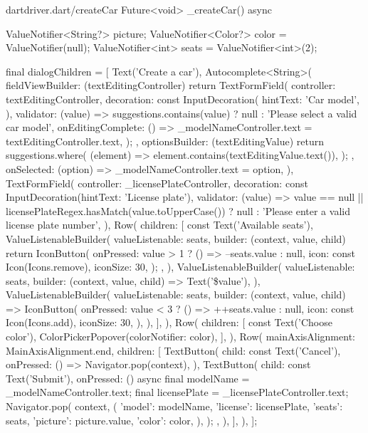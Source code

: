 \documentclass[../thesis.tex]{subfiles}
\begin{document}
\begin{codeblock}{dart}{driver.dart/createCar}
  Future<void> _createCar() async {
    ValueNotifier<String?> picture;
    ValueNotifier<Color?> color = ValueNotifier(null);
    ValueNotifier<int> seats = ValueNotifier<int>(2);

    final dialogChildren = [
      Text('Create a car'),
      Autocomplete<String>(
        fieldViewBuilder: (textEditingController) {
          return TextFormField(
            controller: textEditingController,
            decoration: const InputDecoration(
              hintText: 'Car model',
            ),
            validator: (value) => suggestions.contains(value)
                ? null
                : 'Please select a valid car model',
            onEditingComplete: () =>
                _modelNameController.text = textEditingController.text,
          );
        },
        optionsBuilder: (textEditingValue) {
          return suggestions.where(
            (element) => element.contains(textEditingValue.text()),
          );
        },
        onSelected: (option) => _modelNameController.text = option,
      ),
      TextFormField(
        controller: _licensePlateController,
        decoration: const InputDecoration(hintText: 'License plate'),
        validator: (value) =>
            value == null || licensePlateRegex.hasMatch(value.toUpperCase())
                ? null
                : 'Please enter a valid license plate number',
      ),
      Row(
        children: [
          const Text('Available seats'),
          ValueListenableBuilder(
            valueListenable: seats,
            builder: (context, value, child) {
              return IconButton(
                onPressed: value > 1 ? () => --seats.value : null,
                icon: const Icon(Icons.remove),
                iconSize: 30,
              );
            },
          ),
          ValueListenableBuilder(
            valueListenable: seats,
            builder: (context, value, child) => Text('\$value'),
          ),
          ValueListenableBuilder(
            valueListenable: seats,
            builder: (context, value, child) => IconButton(
              onPressed: value < 3 ? () => ++seats.value : null,
              icon: const Icon(Icons.add),
              iconSize: 30,
            ),
          ),
        ],
      ),
      Row(
        children: [
          const Text('Choose color'),
          ColorPickerPopover(colorNotifier: color),
        ],
      ),
      Row(
        mainAxisAlignment: MainAxisAlignment.end,
        children: [
          TextButton(
            child: const Text('Cancel'),
            onPressed: () => Navigator.pop(context),
          ),
          TextButton(
            child: const Text('Submit'),
            onPressed: () async {
              final modelName = _modelNameController.text;
              final licensePlate = _licensePlateController.text;
              Navigator.pop(
                context,
                ({
                  'model': modelName,
                  'license': licensePlate,
                  'seats': seats,
                  'picture': picture.value,
                  'color': color,
                }),
              );
            },
          ),
        ],
      ),
    ];

}
\end{codeblock}
\end{document}
